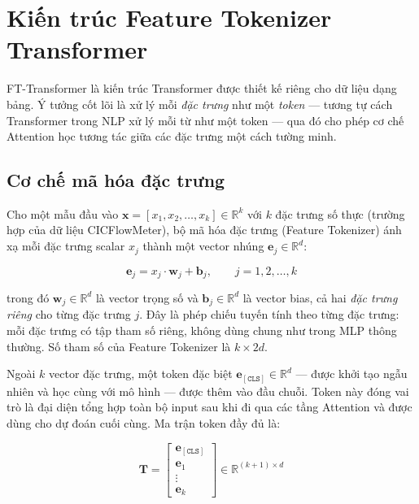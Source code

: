 \documentclass[../DoAn.tex]{subfiles}
\begin{document}
\section{Kiến trúc Feature Tokenizer Transformer}
\label{sec:ftt}

FT-Transformer \cite{gorishniy2021} là kiến trúc Transformer được thiết kế riêng cho dữ liệu dạng bảng. Ý tưởng cốt lõi là xử lý mỗi \textit{đặc trưng} như một \textit{token} --- tương tự cách Transformer trong NLP xử lý mỗi từ như một token --- qua đó cho phép cơ chế Attention học tương tác giữa các đặc trưng một cách tường minh.

\subsection{Cơ chế mã hóa đặc trưng}
\label{subsec:ftt-tokenize}

Cho một mẫu đầu vào $\mathbf{x} = [x_1, x_2, \ldots, x_k] \in \mathbb{R}^k$ với $k$ đặc trưng số thực (trường hợp của dữ liệu CICFlowMeter), bộ mã hóa đặc trưng (Feature Tokenizer) ánh xạ mỗi đặc trưng scalar $x_j$ thành một vector nhúng $\mathbf{e}_j \in \mathbb{R}^d$:

\begin{equation}
    \mathbf{e}_j = x_j \cdot \mathbf{w}_j + \mathbf{b}_j, \qquad j = 1, 2, \ldots, k
    \label{eq:feature-tokenizer}
\end{equation}

trong đó $\mathbf{w}_j \in \mathbb{R}^d$ là vector trọng số và $\mathbf{b}_j \in \mathbb{R}^d$ là vector bias, cả hai \textit{đặc trưng riêng} cho từng đặc trưng $j$. Đây là phép chiếu tuyến tính theo từng đặc trưng: mỗi đặc trưng có tập tham số riêng, không dùng chung như trong MLP thông thường. Số tham số của Feature Tokenizer là $k \times 2d$.

Ngoài $k$ vector đặc trưng, một token đặc biệt $\mathbf{e}_{[\texttt{CLS}]} \in \mathbb{R}^d$ --- được khởi tạo ngẫu nhiên và học cùng với mô hình --- được thêm vào đầu chuỗi. Token này đóng vai trò là đại diện tổng hợp toàn bộ input sau khi đi qua các tầng Attention và được dùng cho dự đoán cuối cùng. Ma trận token đầy đủ là:

\begin{equation}
    \mathbf{T} = \begin{bmatrix} \mathbf{e}_{[\texttt{CLS}]} \\ \mathbf{e}_1 \\ \vdots \\ \mathbf{e}_k \end{bmatrix} \in \mathbb{R}^{(k+1) \times d}
    \label{eq:token-matrix}
\end{equation}
\end{document}

